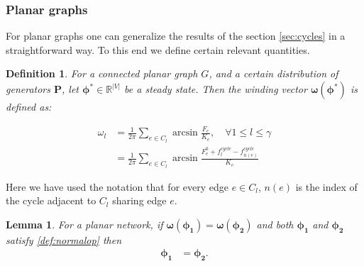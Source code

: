 \documentclass[10pt,aps,pra,onecolumn,superscriptaddress]{revtex4-1}
\newtheorem{defn}[thm]{Definition}
\renewcommand{\vec}[1]{\boldsymbol{#1}}
\newtheorem{lemma}{Lemma}
\begin{document}
\subsubsection{Planar graphs}
For planar graphs one can generalize the results of the section \ref{sec:cycles} in 
a straightforward way. To this end we define certain relevant quantities.  

\begin{defn}
\label{def:wvec}
For a connected planar graph $G$, and a certain distribution of generators $\vec{P}$, let $\vec{\phi^*}\in \mathbb{R}^{|V|}$ be a 
steady state.  Then the \emph{winding vector} $\vec{\omega}(\vec{\phi^*})$ is defined as:

\begin{align*}
\omega_l &= \frac{1}{2\pi} \sum_{e\in C_l} \arcsin{\frac{F_e}{K_e}}, \quad \forall 1 \leq l 
\leq \gamma\\
&=\frac{1}{2\pi} \sum_{e\in C_l} \arcsin{\frac{F_e^0+f^{cycle}_l-f^{cycle}_{n(e)}}{K_e}}
\end{align*}
\end{defn}

Here we have used the notation that for every edge $e\in C_l$, $n(e)$ is the 
index of the cycle adjacent to $C_l$ sharing edge $e$.  


\begin{lemma}
\label{lem:wind-fp-corr-planar}
For a planar network, if $\vec{\omega}(\vec{\phi_1})=\vec{\omega}(\vec{\phi_2})$ and both 
$\vec{\phi_1}$ and $\vec{\phi_2}$ satisfy \eqref{def:normalop} then 
\begin{align}
\label{}
\vec{\phi_1}&=\vec{\phi_2}. 
\end{align}
\end{lemma}
\end{document}
